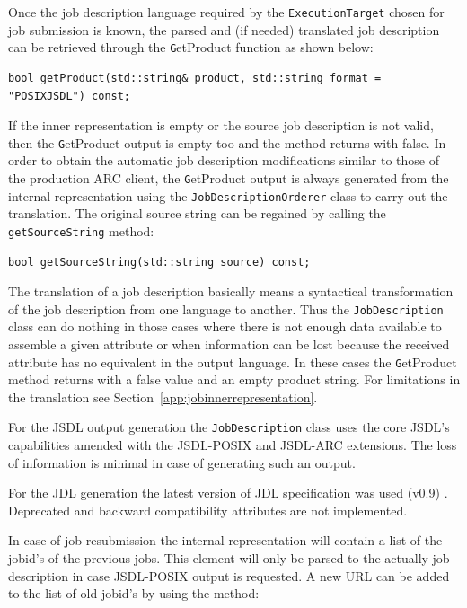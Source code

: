 \documentclass{book}
\newcommand{\ExecutionTarget}{\texttt{ExecutionTarget}}
\newcommand{\JobDescription}{\texttt{JobDescription}}
\begin{document}
Once the job description language required by the {\ExecutionTarget} chosen 
for job submission is known, the parsed and (if needed) translated job description 
can be retrieved through the {\texttt GetProduct} function as shown below:

\begin{shaded}
\begin{verbatim}
bool getProduct(std::string& product, std::string format = "POSIXJSDL") const;
\end{verbatim}
\end{shaded}

If the inner representation is empty or the source job description is not
valid, then the {\texttt GetProduct} output is empty too and the method 
returns with false.  In order to obtain the automatic job description 
modifications similar to those of the production ARC client, the 
{\texttt GetProduct} output is always generated from the internal 
representation using the \texttt{JobDescriptionOrderer} class to carry 
out the translation. The original source string can be regained by
calling the \texttt{getSourceString} method:

\begin{shaded}
\begin{verbatim}
bool getSourceString(std::string source) const;
\end{verbatim}
\end{shaded}

The translation of a job description basically means a syntactical transformation 
of the job description from one language to another. Thus the {\JobDescription}
class can do nothing in those cases where there is not enough data available 
to assemble a given attribute or when information can be lost because the received 
attribute has no equivalent in the output language. In these cases the {\texttt GetProduct} 
method returns with a false value and an empty product string. For limitations in the translation
see Section~\ref{app:jobinnerrepresentation}.

For the JSDL output generation the {\JobDescription} class uses
the core JSDL's capabilities amended with the JSDL-POSIX and JSDL-ARC
extensions. The loss of information is minimal in case of generating
such an output.

For the JDL generation the latest version of JDL specification was
used (v0.9) \cite{jdl}. Deprecated and backward compatibility
attributes are not implemented.

In case of job resubmission the internal representation will contain a list of 
the jobid's of the previous jobs. This element will only be parsed to the 
actually job description in case JSDL-POSIX output is requested. A new URL 
can be added to the list of old jobid's by using the method:
\end{document}
